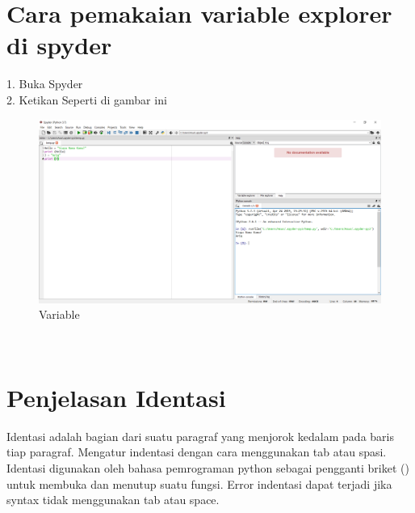 \documentclass[12pt, times new roman, a4paper]{article}
\begin{document}
\section{Cara pemakaian variable explorer di spyder}
1. Buka Spyder\\
2. Ketikan Seperti di gambar ini\\
\begin{figure}[h]
	\centering
		\includegraphics[scale=0.2]{Gambar/V1}
	\caption{Variable}
\end{figure}
\\
\section{Penjelasan Identasi}
Identasi adalah bagian dari suatu paragraf yang menjorok kedalam pada baris tiap paragraf. Mengatur indentasi dengan cara menggunakan tab atau spasi. Identasi digunakan oleh bahasa pemrograman python sebagai pengganti briket () untuk membuka dan menutup suatu fungsi. Error indentasi dapat terjadi jika syntax tidak menggunakan tab atau space.
\end{document}

